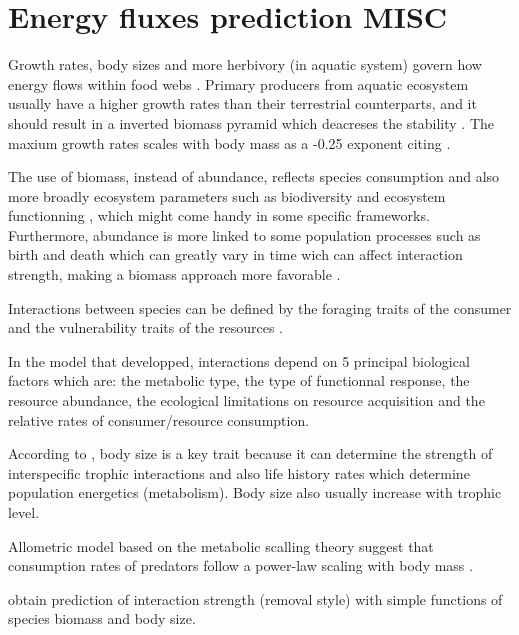 \documentclass[english,12pt]{article}
\begin{document}
\section{Energy fluxes prediction MISC}
Growth rates, body sizes and more herbivory (in aquatic system) govern how energy flows within food webs \citep{Rip2011CroDif}. Primary producers from aquatic ecosystem usually have a higher growth rates than their terrestrial counterparts, and it should result in a inverted biomass pyramid which deacreses the stability \citep{Rip2011CroDif}. The maxium growth rates scales with body mass as a -0.25 exponent \citep{Rip2011CroDif} citing \citep{Brown2004MetThe}.\

The use of biomass, instead of abundance, reflects species consumption and also more broadly ecosystem parameters such as biodiversity and ecosystem functionning \citep{Emmerson2004PrePre}, which might come handy in some specific frameworks. Furthermore, abundance is more linked to some population processes such as birth and death which can greatly vary in time wich can affect interaction strength, making a biomass approach more favorable \citep{Wootton2005MeaInta}.

Interactions between species can be defined by the foraging traits of the consumer and the vulnerability traits of the resources \citep{Laigle2018SpeTra}.

In the model that \citet{Yodzis1992BodSiz} developped, interactions depend on 5 principal biological factors which are: the metabolic type, the type of functionnal response, the resource abundance, the ecological limitations on resource acquisition and the relative rates of consumer/resource consumption.

According to \citet{Pawar2015RolBod}, body size is a key trait because it can determine the strength of interspecific trophic interactions and also life history rates which determine population energetics (metabolism). Body size also usually increase with trophic level.
 
Allometric model based on the metabolic scalling theory suggest that consumption rates of predators follow a power-law scaling with body mass \citep{Brose2008ForThe}.

\citet{Berlow2009SimPre} obtain prediction of interaction strength (removal style) with simple functions of species biomass and body size.
\end{document}
